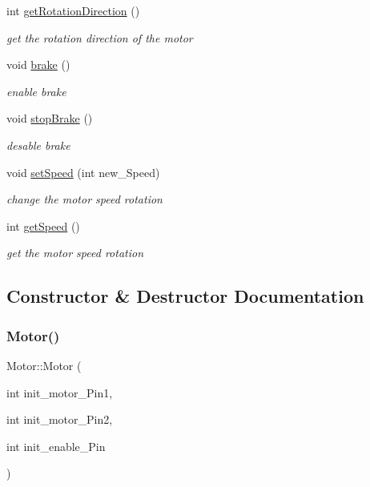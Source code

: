 \begin{DoxyCompactItemize}
int \hyperlink{class_motor_a45a803953ffadfb187cbbad35702da69}{get\+Rotation\+Direction} ()
\begin{DoxyCompactList}\small\item\em get the rotation direction of the motor \end{DoxyCompactList}\item 
void \hyperlink{class_motor_ae8747855c2e4cb1992eaddf687db7a6f}{brake} ()
\begin{DoxyCompactList}\small\item\em enable brake \end{DoxyCompactList}\item 
void \hyperlink{class_motor_aeeb75807f8bda1d83456590e740b3c32}{stop\+Brake} ()
\begin{DoxyCompactList}\small\item\em desable brake \end{DoxyCompactList}\item 
void \hyperlink{class_motor_a6ac966a2639aaba6a19e1596a37bc475}{set\+Speed} (int new\+\_\+\+Speed)
\begin{DoxyCompactList}\small\item\em change the motor speed rotation \end{DoxyCompactList}\item 
int \hyperlink{class_motor_a4d03ea62bd9f5579d4fbe16d10462962}{get\+Speed} ()
\begin{DoxyCompactList}\small\item\em get the motor speed rotation \end{DoxyCompactList}\end{DoxyCompactItemize}


\subsection{Constructor \& Destructor Documentation}
\mbox{\label{class_motor_af153121a5e217901c8e3d47727b4e2d2}} 
\subsubsection{\texorpdfstring{Motor()}{Motor()}}
{\footnotesize\ttfamily Motor\+::\+Motor (\begin{DoxyParamCaption}\item[{int}]{init\+\_\+motor\+\_\+\+Pin1,  }\item[{int}]{init\+\_\+motor\+\_\+\+Pin2,  }\item[{int}]{init\+\_\+enable\+\_\+\+Pin }\end{DoxyParamCaption})}




